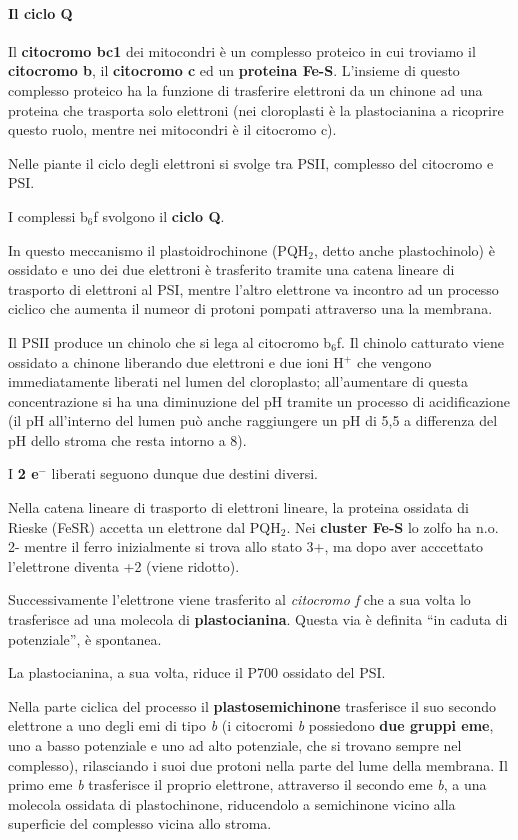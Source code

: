 \documentclass[]{article}
\begin{document}
\paragraph{Il ciclo Q}\label{il-ciclo-q}

Il \textbf{citocromo bc1} dei mitocondri è un complesso proteico in cui
troviamo il \textbf{citocromo b}, il \textbf{citocromo c} ed un
\textbf{proteina Fe-S}. L'insieme di questo complesso proteico ha la
funzione di trasferire elettroni da un chinone ad una proteina che
trasporta solo elettroni (nei cloroplasti è la plastocianina a ricoprire
questo ruolo, mentre nei mitocondri è il citocromo c).

Nelle piante il ciclo degli elettroni si svolge tra PSII, complesso del
citocromo e PSI.

I complessi b$_6$f svolgono il \textbf{ciclo Q}.

In questo meccanismo il plastoidrochinone (PQH$_2$, detto anche
plastochinolo) è ossidato e uno dei due elettroni è trasferito tramite
una catena lineare di trasporto di elettroni al PSI, mentre l'altro
elettrone va incontro ad un processo ciclico che aumenta il numeor di
protoni pompati attraverso una la membrana.

Il PSII produce un chinolo che si lega al citocromo b$_6$f. Il chinolo
catturato viene ossidato a chinone liberando due elettroni e due ioni
H$^+$ che vengono immediatamente liberati nel lumen del cloroplasto;
all'aumentare di questa concentrazione si ha una diminuzione del pH
tramite un processo di acidificazione (il pH all'interno del lumen può
anche raggiungere un pH di 5,5 a differenza del pH dello stroma che
resta intorno a 8).

I \textbf{2 e$^-$} liberati seguono dunque due destini diversi.

Nella catena lineare di trasporto di elettroni lineare, la proteina
ossidata di Rieske (FeSR) accetta un elettrone dal PQH$_2$. Nei
\textbf{cluster Fe-S} lo zolfo ha n.o. 2- mentre il ferro inizialmente
si trova allo stato 3+, ma dopo aver acccettato l'elettrone diventa +2
(viene ridotto).

Successivamente l'elettrone viene trasferito al \emph{citocromo f} che a
sua volta lo trasferisce ad una molecola di \textbf{plastocianina}.
Questa via è definita ``in caduta di potenziale'', è spontanea.

La plastocianina, a sua volta, riduce il P700 ossidato del PSI.

Nella parte ciclica del processo il \textbf{plastosemichinone}
trasferisce il suo secondo elettrone a uno degli emi di tipo \emph{b} (i
citocromi \emph{b} possiedono \textbf{due gruppi eme}, uno a basso
potenziale e uno ad alto potenziale, che si trovano sempre nel
complesso), rilasciando i suoi due protoni nella parte del lume della
membrana. Il primo eme \emph{b} trasferisce il proprio elettrone,
attraverso il secondo eme \emph{b}, a una molecola ossidata di
plastochinone, riducendolo a semichinone vicino alla superficie del
complesso vicina allo stroma.
\end{document}
